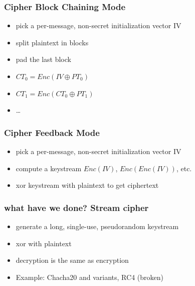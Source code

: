 \documentclass[serif,aspectratio=169]{beamer}
\begin{document}
\begin{frame}
	\frametitle{Cipher Block Chaining Mode}
	\begin{itemize}
		\item pick a per-message, non-secret initialization vector IV
		\item split plaintext in blocks
		\item pad the last block
		\item $CT_0 = Enc(IV \oplus PT_0)$
		\item $CT_1 = Enc(CT_0 \oplus PT_1)$
		\item \ldots
	\end{itemize}
\end{frame}
\begin{frame}
	\frametitle{Cipher Feedback Mode}
	\begin{itemize}
		\item pick a per-message, non-secret initialization vector IV
		\item compute a keystream $Enc(IV)$, $Enc(Enc(IV))$, etc.
		\item xor keystream with plaintext to get ciphertext
	\end{itemize}
\end{frame}
\begin{frame}
	\frametitle{what have we done? Stream cipher}
	\begin{itemize}
		\item generate a long, single-use, pseudorandom keystream
		\item xor with plaintext
		\item decryption is the same as encryption
		\item Example: Chacha20 and variants, RC4 (broken)
	\end{itemize}
\end{frame}
\end{document}
